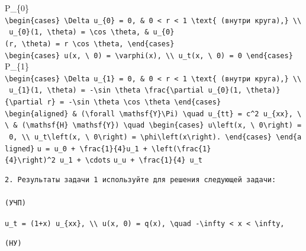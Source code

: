 \documentclass[
  ukrainian,
]{article}
\begin{document}
P\_\{0\}
\texttt{\textbackslash{}begin\{cases\}\ \textbackslash{}Delta\ u\_\{0\}\ =\ 0,\ \&\ 0\ \textless{}\ r\ \textless{}\ 1\ \textbackslash{}text\{\ (внутри\ круга),\}\ \textbackslash{}\textbackslash{}\ u\_\{0\}(1,\ \textbackslash{}theta)\ =\ \textbackslash{}cos\ \textbackslash{}theta,\ \&\ u\_\{0\}(r,\ \textbackslash{}theta)\ =\ r\ \textbackslash{}cos\ \textbackslash{}theta,\ \textbackslash{}end\{cases\}}
\texttt{\textbackslash{}begin\{cases\}\ u(x,\ \textbackslash{}\ 0)\ =\ \textbackslash{}varphi(x),\ \textbackslash{}\textbackslash{}\ u\_t(x,\ \textbackslash{}\ 0)\ =\ 0\ \textbackslash{}end\{cases\}}
P\_\{1\}
\texttt{\textbackslash{}begin\{cases\}\ \textbackslash{}Delta\ u\_\{1\}\ =\ 0,\ \&\ 0\ \textless{}\ r\ \textless{}\ 1\ \textbackslash{}text\{\ (внутри\ круга),\}\ \textbackslash{}\textbackslash{}\ u\_\{1\}(1,\ \textbackslash{}theta)\ =\ -\textbackslash{}sin\ \textbackslash{}theta\ \textbackslash{}frac\{\textbackslash{}partial\ u\_\{0\}(1,\ \textbackslash{}theta)\}\{\textbackslash{}partial\ r\}\ =\ -\textbackslash{}sin\ \textbackslash{}theta\ \textbackslash{}cos\ \textbackslash{}theta\ \textbackslash{}end\{cases\}}
\texttt{\textbackslash{}begin\{aligned\}\ \&\ (\textbackslash{}forall\ \textbackslash{}mathsf\{Y\}\textbackslash{}Pi)\ \textbackslash{}quad\ u\_\{tt\}\ =\ c\^{}2\ u\_\{xx\},\ \textbackslash{}\textbackslash{}\ \&\ (\textbackslash{}mathsf\{H\}\ \textbackslash{}mathsf\{Y\})\ \textbackslash{}quad\ \textbackslash{}begin\{cases\}\ u\textbackslash{}left(x,\ \textbackslash{}\ 0\textbackslash{}right)\ =\ 0,\ \textbackslash{}\textbackslash{}\ u\_t\textbackslash{}left(x,\ \textbackslash{}\ 0\textbackslash{}right)\ =\ \textbackslash{}phi\textbackslash{}left(x\textbackslash{}right).\ \textbackslash{}end\{cases\}\ \textbackslash{}end\{aligned\}}
\texttt{u\ =\ u\_0\ +\ \textbackslash{}frac\{1\}\{4\}u\_1\ +\ \textbackslash{}left(\textbackslash{}frac\{1\}\{4\}\textbackslash{}right)\^{}2\ u\_1\ +\ \textbackslash{}cdots}
\texttt{u\_u\ +\ \textbackslash{}frac\{1\}\{4\}\ u\_t}

\begin{verbatim}
2. Результаты задачи 1 используйте для решения следующей задачи:

(УЧП)
\end{verbatim}

\texttt{u\_t\ =\ (1+x)\ u\_\{xx\},\ \textbackslash{}\textbackslash{}\ u(x,\ 0)\ =\ q(x),\ \textbackslash{}quad\ -\textbackslash{}infty\ \textless{}\ x\ \textless{}\ \textbackslash{}infty,}

\begin{verbatim}
(НУ)
\end{verbatim}
\end{document}
